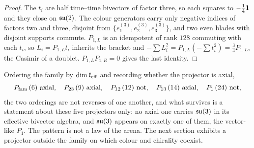 \begin{proof}
The $t_i$ are half time--time bivectors of factor three, so each squares to $-\tfrac14\mathbf 1$ and they close on $\mathfrak{su}(2)$. The colour generators
carry only negative indices of factors two and three, disjoint from $\{e^{(3)}_1,e^{(3)}_2,e^{(3)}_3\}$, and two even blades with disjoint
supports commute. $P_{1,L}$ is an idempotent of rank $128$ commuting with each $t_i$, so $L_i=P_{1,L}t_i$ inherits the bracket and
$-\sum L_i^2=P_{1,L}(-\sum t_i^2)=\tfrac34P_{1,L}$, the Casimir of a doublet. $P_{1,L}P_{1,R}=0$ gives the last identity.
\end{proof}

Ordering the family by $\dim\mathfrak k_{\rm eff}$ and recording whether the projector is axial,
\[
\Pfam\,(6)\ \text{axial},\quad P_{23}\,(9)\ \text{axial},\quad P_{12}\,(12)\ \text{not},\quad P_{13}\,(14)\ \text{axial},\quad P_1\,(24)\ \text{not},
\]
the two orderings are not reverses of one another, and what survives is a statement about these five projectors only: no axial one
carries $\mathfrak{su}(3)$ in its effective bivector algebra, and $\mathfrak{su}(3)$ appears on exactly one of them, the vector-like $P_1$. The pattern is
not a law of the arena. The next section exhibits a projector outside the family on which colour and chirality coexist.
